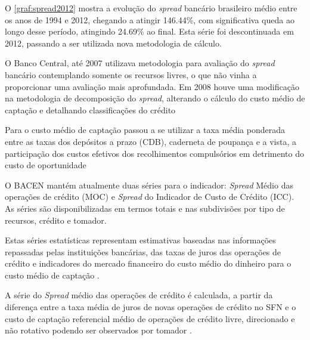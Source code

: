 \documentclass[
  12pt,
  12pt,
  openright,
  oneside,
  a4paper,
  chapter=TITLE,
  section=TITLE,
  subsection=TITLE,
  subsubsection=TITLE,
  portugues,
  sumario=tradicional]{abntex2}
\begin{document}
O \autoref{graf:spread2012} mostra a evolução do \emph{spread} bancário brasileiro médio entre os anos de 1994 e 2012, chegando a atingir 146.44\%, com significativa queda ao longo desse período, atingindo 24.69\% ao final. Esta série foi descontinuada em 2012, passando a ser utilizada nova metodologia de cálculo.

O Banco Central, até 2007 utilizava metodologia para avaliação do \emph{spread} bancário contemplando somente os recursos livres, o que não vinha a proporcionar uma avaliação mais aprofundada. Em 2008 houve uma modificação na metodologia de decomposição do \emph{spread}, alterando o cálculo do custo médio de captação e detalhando classificações do crédito \cite{dantas:2012}

Para o custo médio de captação passou a se utilizar a taxa média ponderada entre as taxas dos depósitos a prazo (CDB), caderneta de poupança e a vista, a participação dos custos efetivos dos recolhimentos compulsórios em detrimento do custo de oportunidade \cite{dantas:2012}

O BACEN mantém atualmente duas séries para o indicador: \emph{Spread} Médio das operações de crédito (MOC) e \emph{Spread} do Indicador de Custo de Crédito (ICC). As séries são disponibilizadas em termos totais e nas subdivisões por tipo de
recursos, crédito e tomador.

Estas séries estatísticas representam estimativas baseadas nas informações repassadas pelas instituições bancárias, das taxas de juros das operações de crédito e indicadores do mercado financeiro do custo médio do dinheiro para o custo médio de captação \cite{BCB:2016}.

A série do \emph{Spread} médio das operações de crédito é calculada, a partir da diferença entre a taxa média de juros de novas operações de crédito no SFN e o custo de captação referencial médio de operações de crédito livre, direcionado e não rotativo podendo ser observados por tomador \cite{BCB:2016}.
\end{document}
